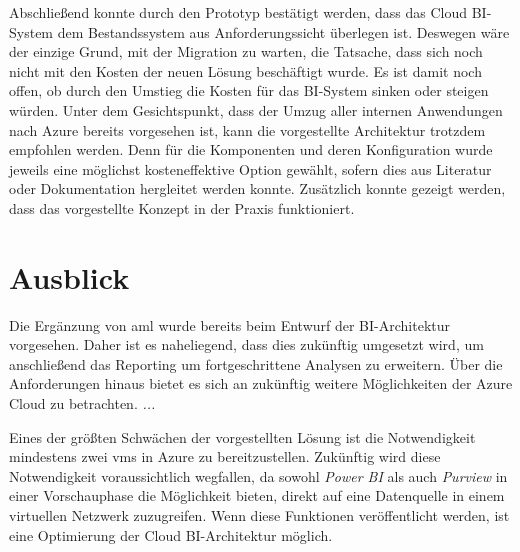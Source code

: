Abschließend konnte durch den Prototyp bestätigt werden, dass das Cloud BI-System dem Bestandssystem aus Anforderungssicht überlegen ist. Deswegen wäre der einzige Grund, mit der Migration zu warten, die Tatsache, dass sich noch nicht mit den Kosten der neuen Lösung beschäftigt wurde. Es ist damit noch offen, ob durch den Umstieg die Kosten für das BI-System sinken oder steigen würden. Unter dem Gesichtspunkt, dass der Umzug aller internen Anwendungen nach Azure bereits vorgesehen ist, kann die vorgestellte Architektur trotzdem empfohlen werden. Denn für die Komponenten und deren Konfiguration wurde jeweils eine möglichst kosteneffektive Option gewählt, sofern dies aus Literatur oder Dokumentation hergleitet werden konnte. Zusätzlich konnte gezeigt werden, dass das vorgestellte Konzept in der Praxis funktioniert. 

\section{Ausblick}
Die Ergänzung von \ac{aml} wurde bereits beim Entwurf der BI-Architektur vorgesehen. Daher ist es naheliegend, dass dies zukünftig umgesetzt wird, um anschließend das Reporting um fortgeschrittene Analysen zu erweitern. Über die Anforderungen hinaus bietet es sich an zukünftig weitere Möglichkeiten der Azure Cloud zu betrachten. \textit{...}

Eines der größten Schwächen der vorgestellten Lösung ist die Notwendigkeit mindestens zwei \acp{vm} in Azure zu bereitzustellen. Zukünftig wird diese Notwendigkeit voraussichtlich wegfallen, da sowohl \textit{Power BI} als auch \textit{Purview} in einer Vorschauphase die Möglichkeit bieten, direkt auf eine Datenquelle in einem virtuellen Netzwerk zuzugreifen. Wenn diese Funktionen veröffentlicht werden, ist eine Optimierung der Cloud BI-Architektur möglich.